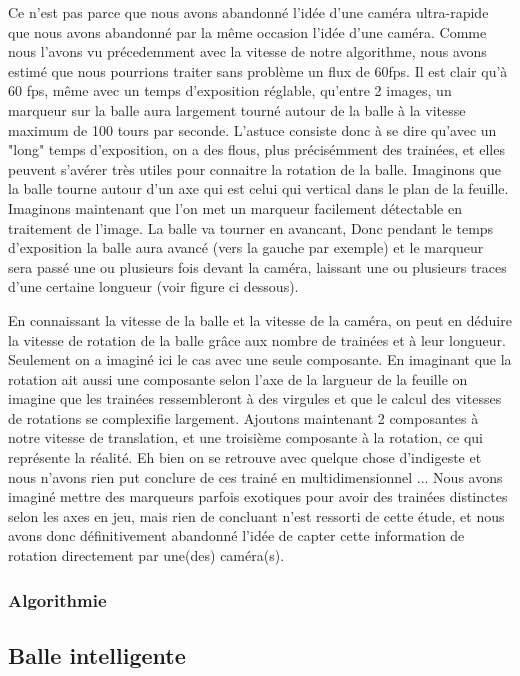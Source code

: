 Ce n'est pas parce que nous avons abandonné l'idée d'une caméra ultra-rapide que nous avons abandonné par la même occasion l'idée d'une caméra. Comme nous l'avons vu précedemment avec la vitesse de notre algorithme, nous avons estimé que nous pourrions traiter sans problème un flux de 60fps. Il est clair qu'à 60 fps, même avec un temps d'exposition réglable, qu'entre 2 images, un marqueur sur la balle aura largement tourné autour de la balle à la vitesse maximum de 100 tours par seconde. L'astuce consiste donc à se dire qu'avec un "long" temps d'exposition, on a des flous, plus précisémment des trainées, et elles peuvent s'avérer très utiles pour connaitre la rotation de la balle. Imaginons que la balle tourne autour d'un axe qui est celui qui vertical dans le plan de la feuille. Imaginons maintenant que l'on met un marqueur facilement détectable en traitement de l'image. La balle va tourner en avancant, Donc pendant le temps d'exposition la balle aura avancé (vers la gauche par exemple) et le marqueur sera passé une ou plusieurs fois devant la caméra, laissant une ou plusieurs traces d'une certaine longueur (voir figure ci dessous).


En connaissant la vitesse de la balle et la vitesse de la caméra, on peut en déduire la vitesse de rotation de la balle grâce aux nombre de trainées et à leur longueur. Seulement on a imaginé ici le cas avec une seule composante. En imaginant que la rotation ait aussi une composante selon l'axe de la largueur de la feuille on imagine que les trainées ressembleront à des virgules et que le calcul des vitesses de rotations se complexifie largement. Ajoutons maintenant 2 composantes à notre vitesse de translation, et une troisième composante à la rotation, ce qui représente la réalité. Eh bien on se retrouve avec quelque chose d'indigeste et nous n'avons rien put conclure de ces trainé en multidimensionnel ... Nous avons imaginé mettre des marqueurs parfois exotiques pour avoir des trainées distinctes selon les axes en jeu, mais rien de concluant n'est ressorti de cette étude, et nous avons donc définitivement abandonné l'idée de capter cette information de rotation directement par une(des) caméra(s).

\subsubsection{Algorithmie}

\subsection{Balle intelligente}

